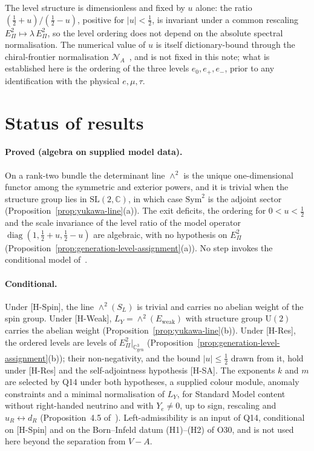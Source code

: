\documentclass[11pt]{article}
\theoremstyle{definition}
\theoremstyle{remark}
\newcommand{\Cgen}{\mathbb{C}^{3}_{\mathrm{gen}}}
\newcommand{\Epi}{E_{\Pi}}
\newcommand{\SW}{S_{L}}
\newcommand{\Ew}{E_{\mathrm{weak}}}
\newcommand{\LY}{L_{Y}}
\newcommand{\Sym}{\mathrm{Sym}}
\newcommand{\UU}{\mathrm{U}}
\newcommand{\SL}{\mathrm{SL}}
\newcommand{\diag}{\operatorname{diag}}
\begin{document}
    The level structure is dimensionless and fixed by $u$ alone: the ratio $(\tfrac12 + u)/(\tfrac12 - u)$, positive
    for $|u| < \tfrac12$, is invariant under a common rescaling $\Epi^{2} \mapsto \lambda\,\Epi^{2}$, so the level ordering does not depend on the absolute spectral normalisation.
    The numerical value of $u$ is itself dictionary-bound through the chiral-frontier normalisation
    $\mathcal{N}_{A}$~\cite{Beau2026aar}, and is not fixed in this note; what is established here is the ordering of the
    three levels $e_{0}, e_{+}, e_{-}$, prior to any identification with the physical $e, \mu, \tau$.

  \section{Status of results}
    \label{sec:status}

    \paragraph{Proved (algebra on supplied model data).}
      On a rank-two bundle the determinant line $\wedge^{2}$ is the unique one-dimensional functor among the symmetric
      and exterior powers, and it is trivial when the structure group lies in $\SL(2,\mathbb{C})$, in which case
      $\Sym^{2}$ is the adjoint sector (Proposition~\ref{prop:yukawa-line}(a)).
      The exit deficits, the ordering for $0 < u < \tfrac12$ and the scale invariance of the level ratio of the
      model operator $\diag(1, \tfrac12 + u, \tfrac12 - u)$ are algebraic, with no hypothesis on $\Epi^{2}$
      (Proposition~\ref{prop:generation-level-assignment}(a)).
      No step invokes the conditional model of~\cite{Beau2026a34}.

    \paragraph{Conditional.}
      Under [H-Spin], the line $\wedge^{2}(\SW)$ is trivial and carries no abelian weight of the spin group.
      Under [H-Weak], $\LY = \wedge^{2}(\Ew)$ with structure group $\UU(2)$ carries the abelian weight
      (Proposition~\ref{prop:yukawa-line}(b)).
      Under [H-Res], the ordered levels are levels of $\Epi^{2}|_{\Cgen}$
      (Proposition~\ref{prop:generation-level-assignment}(b)); their non-negativity, and the bound $|u| \leq \tfrac12$
      drawn from it, hold under [H-Res] and the self-adjointness hypothesis [H-SA].
      The exponents $k$ and $m$ are selected by Q14 under both hypotheses, a supplied colour module, anomaly
      constraints and a minimal normalisation of $\LY$, for Standard Model content without right-handed neutrino and with
      $Y_{e} \neq 0$, up to sign, rescaling and $u_{R} \leftrightarrow d_{R}$ (Proposition~4.5 of~\cite{Beau2026q14}).
      Left-admissibility is an input of Q14, conditional on [H-Spin] and on the Born--Infeld datum (H1)--(H2) of O30,
      and is not used here beyond the separation from $V-A$.
\end{document}

